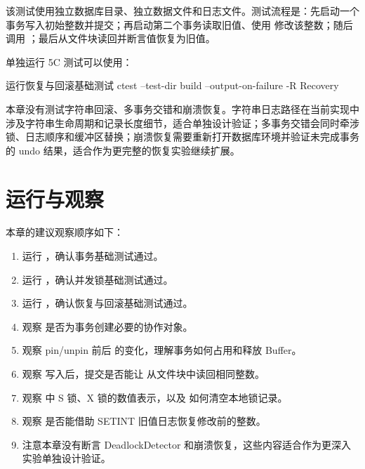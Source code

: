 该测试使用独立数据库目录、独立数据文件和日志文件。测试流程是：先启动一个事务写入初始整数并提交；再启动第二个事务读取旧值、使用  修改该整数；随后调用 ；最后从文件块读回并断言值恢复为旧值。

单独运行 5C 测试可以使用：

\begin{dbcode}[listing options={language=bash}]{运行恢复与回滚基础测试}
ctest --test-dir build --output-on-failure -R Recovery
\end{dbcode}

本章没有测试字符串回滚、多事务交错和崩溃恢复。字符串日志路径在当前实现中涉及字符串生命周期和记录长度细节，适合单独设计验证；多事务交错会同时牵涉锁、日志顺序和缓冲区替换；崩溃恢复需要重新打开数据库环境并验证未完成事务的 undo 结果，适合作为更完整的恢复实验继续扩展。

\section{运行与观察}
\label{sec:tx-run-observe}

本章的建议观察顺序如下：

\begin{enumerate}
  \item 运行 ，确认事务基础测试通过。
  \item 运行 ，确认并发锁基础测试通过。
  \item 运行 ，确认恢复与回滚基础测试通过。
  \item 观察  是否为事务创建必要的协作对象。
  \item 观察 pin/unpin 前后  的变化，理解事务如何占用和释放 Buffer。
  \item 观察  写入后，提交是否能让  从文件块中读回相同整数。
  \item 观察  中 S 锁、X 锁的数值表示，以及  如何清空本地锁记录。
  \item 观察  是否能借助 SETINT 旧值日志恢复修改前的整数。
  \item 注意本章没有断言 DeadlockDetector 和崩溃恢复，这些内容适合作为更深入实验单独设计验证。
\end{enumerate}


